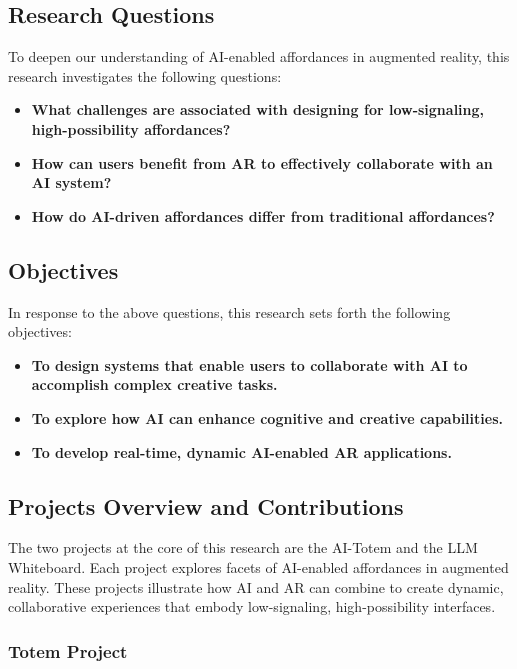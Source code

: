 \subsection{Research Questions}

To deepen our understanding of AI-enabled affordances in augmented reality, this research investigates the following questions:

\begin{itemize}
    \item \textbf{What challenges are associated with designing for low-signaling, high-possibility affordances?}
    \item \textbf{How can users benefit from AR to effectively collaborate with an AI system?}
    \item \textbf{How do AI-driven affordances differ from traditional affordances?}
\end{itemize}

\subsection{Objectives}

In response to the above questions, this research sets forth the following objectives:

\begin{itemize}
    \item \textbf{To design systems that enable users to collaborate with AI to accomplish complex creative tasks.}
    \item \textbf{To explore how AI can enhance cognitive and creative capabilities.}
    \item \textbf{To develop real-time, dynamic AI-enabled AR applications.}
\end{itemize}


\subsection{Projects Overview and Contributions}

The two projects at the core of this research are the AI-Totem and the LLM Whiteboard. Each project explores facets of AI-enabled affordances in augmented reality.
These projects illustrate how AI and AR can combine to create dynamic, collaborative experiences that embody low-signaling, high-possibility interfaces.

\subsubsection{Totem Project}

